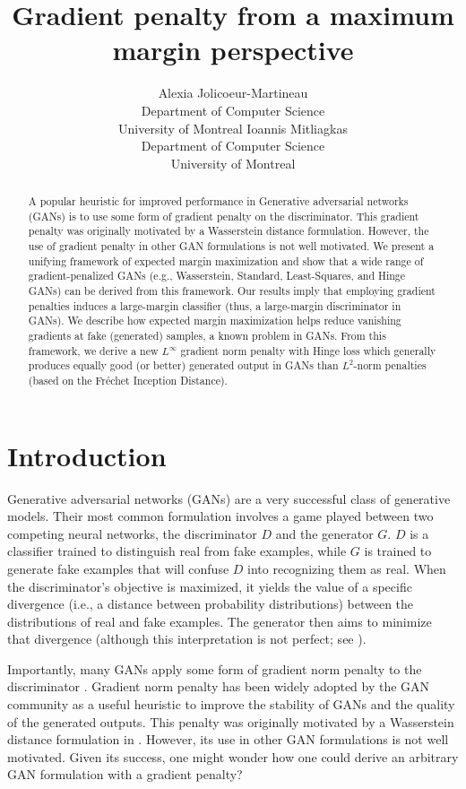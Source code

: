 \documentclass{article}
\title{Gradient penalty from a maximum margin perspective}
\author{Alexia Jolicoeur-Martineau \\
  Department of Computer Science\\
  University of Montreal
  \And
  Ioannis Mitliagkas \\
  Department of Computer Science\\
  University of Montreal
}
\begin{document}
\maketitle

\begin{abstract}
A popular heuristic for improved performance in Generative adversarial networks (GANs) is to use some form of gradient penalty on the discriminator. This gradient penalty was originally motivated by a Wasserstein distance formulation. However, the use of gradient penalty in other GAN formulations is not well motivated. We present a unifying framework of expected margin maximization and show that a wide range of gradient-penalized GANs (e.g., Wasserstein, Standard, Least-Squares, and Hinge GANs) can be derived from this framework. Our results imply that employing gradient penalties induces a large-margin classifier (thus, a large-margin discriminator in GANs). We describe how expected margin maximization helps reduce vanishing gradients at fake (generated) samples, a known problem in GANs. From this framework, we derive a new $L^\infty$ gradient norm penalty with Hinge loss which generally produces equally good (or better) generated output in GANs than $L^2$-norm penalties (based on the Fréchet Inception Distance).
\end{abstract}

\section{Introduction}



    Generative adversarial networks (GANs) \citep{GAN} are a very successful class of generative models.
    Their most common formulation involves a game played between two competing neural networks, the discriminator $D$ and the generator $G$.
    $D$ is a classifier trained to distinguish real from fake examples, while $G$ is trained to generate fake examples that will confuse $D$ into recognizing them as real.
    When the discriminator's objective is maximized, it yields the value of a specific divergence (i.e., a distance between probability distributions) between the distributions of real and fake examples. The generator then aims to minimize that divergence (although this interpretation is not perfect; see \citet{jolicoeur2018beyonddivergence}).
    
    Importantly, many GANs apply some form of gradient norm penalty to the discriminator \citep{WGAN-GP,fedus2017many,mescheder2018training,karras2019style}. Gradient norm penalty has been widely adopted by the GAN community as a useful heuristic to improve the stability of GANs and the quality of the generated outputs. This penalty was originally motivated by a Wasserstein distance formulation in \citet{WGAN-GP}. However, its use in other GAN formulations is not well motivated. Given its success, one might wonder how one could derive an arbitrary GAN formulation with a gradient penalty?
    
\end{document}
